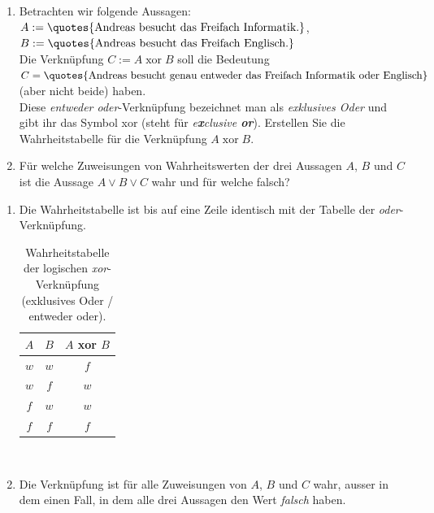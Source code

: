 \begin{myexercise}%
	\noindent
	\begin{enumerate}[label=(\alph*)]
		\item Betrachten wir folgende Aussagen:\\
		      $A := \text{\quotes{Andreas besucht das Freifach Informatik.}}$,\\
		      $B := \text{\quotes{Andreas besucht das Freifach Englisch.}}$\\
		      Die Verknüpfung $C := A\; \text{xor}\; B$ soll die Bedeutung\\
		      $C = \text{\quotes{Andreas besucht genau entweder das Freifach Informatik oder Englisch}}$ (aber nicht beide) haben.\\

		      \noindent
		      Diese \textit{entweder oder}-Verknüpfung bezeichnet man als \textit{exklusives Oder} und gibt ihr das Symbol xor (steht für \textit{e\textbf{x}clusive \textbf{or}}). Erstellen Sie die Wahrheitstabelle für die Verknüpfung $A\; \text{xor}\; B$.
		\item Für welche Zuweisungen von Wahrheitswerten der drei Aussagen $A$, $B$ und $C$ ist die Aussage $A\lor B\lor C$ wahr und für welche falsch?
	\end{enumerate}
\end{myexercise}
\vspace{0.3cm}
\begin{myanswer}
	\noindent
	\begin{enumerate}[label=(\alph*)]
		\item Die Wahrheitstabelle ist bis auf eine Zeile identisch mit der Tabelle der \textit{oder}-Verknüpfung.
		      \begin{table}[H]
			      \begin{center}
				      \begin{tabular}{c|c|c}
					      $A$ & $B$ & $A$ xor $B$ \\ \hline
					      $w$ & $w$ & $f$         \\
					      $w$ & $f$ & $w$         \\
					      $f$ & $w$ & $w$         \\
					      $f$ & $f$ & $f$
				      \end{tabular}
			      \end{center}
			      \caption*{Wahrheitstabelle der logischen \textit{xor}-Verknüpfung (exklusives Oder / entweder oder).}
			      \label{table:xor}
		      \end{table}
		      \\
		\item Die Verknüpfung ist für alle Zuweisungen von $A$, $B$ und $C$ wahr, ausser in dem einen Fall, in dem alle drei Aussagen den Wert \textit{falsch} haben.
	\end{enumerate}
\end{myanswer}

